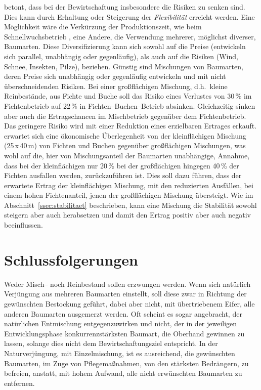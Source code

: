 \documentclass[twocolumn]{scrartcl}
\begin{document}
\cite{knoke2007mischwald} betont, dass bei der Bewirtschaftung
insbesondere die Risiken zu senken sind. Dies kann durch Erhaltung
oder Steigerung der \emph{Flexibilität} erreicht werden. Eine
Möglichkeit wäre die Verkürzung der Produktionszeit, wie beim
Schnellwuchsbetrieb
\citep{bohdanecky1890worlik,schiffel1904Wuchsgestze,schwappach1905durchforstungFichte,eulefeld1922schnellwuchs,gehrhardt1924StammzahlhaltungInJungenFichtenbestaenden},
eine Andere, die Verwendung mehrerer, möglichst diverser,
Baumarten. Diese Diversifizierung kann sich sowohl auf die Preise
(entwickeln sich parallel, unabhängig oder gegenläufig), als auch auf
die Risiken (Wind, Schnee, Insekten, Pilze), beziehen. Günstig sind
Mischungen von Baumarten, deren Preise sich unabhängig oder
gegenläufig entwickeln und mit nicht überschneidenden Risiken. Bei
einer großflächigen Mischung, d.h.\ kleine Reinbestände, aus Fichte
und Buche soll das Risiko eines Verlustes von 30\,\% im Fichtenbetrieb
auf 22\,\% in Fichten--Buchen--Betrieb absinken. Gleichzeitig sinken
aber auch die Ertragschancen im Mischbetrieb gegenüber dem
Fichtenbetrieb. Das geringere Risiko wird mit einer Reduktion eines
erzielbaren Ertrages erkauft. \cite{knoke2007mischwaldB} erwartet sich
eine ökonomische Überlegenheit von der kleinflächigen Mischung
(25\,x\,40\,m) von Fichten und Buchen gegenüber großflächigen
Mischungen, was wohl auf die, hier von Mischungsanteil der Baumarten
unabhängige, Annahme, dass bei der kleinflächigen nur 20\,\% bei der
großflächigen hingegen 40\,\% der Fichten ausfallen werden,
zurückzuführen ist. Dies soll dazu führen, dass der erwartete Ertrag
der kleinflächigen Mischung, mit den reduzierten Ausfällen, bei einem
hohen Fichtenanteil, jenen der großflächigen Mischung übersteigt. Wie
im Abschnitt~\ref{ssec:stabilitaet} beschrieben, kann eine Mischung
die Stabilität sowohl steigern aber auch herabsetzen und damit den
Ertrag positiv aber auch negativ beeinflussen.

\section{Schlussfolgerungen}
\label{sec:schlussfolgerungen}

Weder Misch-- noch Reinbestand sollen erzwungen werden. Wenn sich
natürlich Verjüngung aus mehreren Baumarten einstellt, soll diese zwar
in Richtung der gewünschten Bestockung geführt, dabei aber nicht, mit
übertriebenem Eifer, alle anderen Baumarten ausgemerzt werden. Oft
scheint es sogar angebracht, der natürlichen Entmischung
entgegenzuwirken und nicht, der in der jeweiligen Entwicklungsphase
konkurrenzstärksten Baumart, die Oberhand gewinnen zu lassen, solange
dies nicht dem Bewirtschaftungsziel entspricht. In der
Naturverjüngung, mit Einzelmischung, ist es ausreichend, die
gewünschten Baumarten, im Zuge von Pflegemaßnahmen, von den stärksten
Bedrängern, zu befreien, anstatt, mit hohem Aufwand, alle nicht
erwünschten Baumarten zu entfernen.
\end{document}
